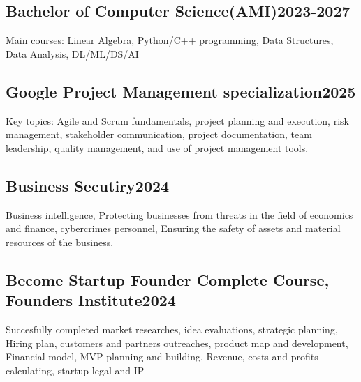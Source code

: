 \vspace*{10pt}

\subsection{{Bachelor of Computer Science(AMI)}\hfill 2023-2027}
\vspace*{5pt}
Main courses: Linear Algebra, Python/C++ programming, Data Structures, Data Analysis, DL/ML/DS/AI

\vspace*{10pt}

\subsection{Google Project Management specialization\hfill 2025}
\vspace*{5pt}
Key topics: Agile and Scrum fundamentals, project planning and execution, risk management, stakeholder communication, project documentation, team leadership, quality management, and use of project management tools. 

\vspace*{10pt}

\subsection{{Business Secutiry}\hfill 2024}
\vspace*{5pt}
Business intelligence, Protecting businesses from threats in the field of economics and finance, cybercrimes personnel, Ensuring the safety of assets and material resources of the business.

\vspace*{10pt}

\subsection{{Become Startup Founder Complete Course, Founders Institute}\hfill 2024}
\vspace*{5pt}
Succesfully completed market researches, idea evaluations, strategic planning, Hiring plan, customers and partners outreaches, product map and development, Financial model, MVP planning and building, Revenue, costs and profits calculating, startup legal and IP

